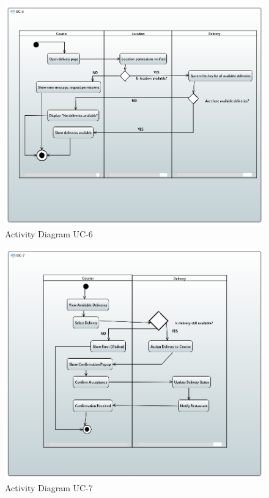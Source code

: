 \begin{figure}[h!]
\begin{center}
\includegraphics[scale=0.5]{FIGS/UC-6.jpg}
    \caption{Activity Diagram UC-6}
    \label{fig:act_diag6}
\end{center}
\end{figure}

\begin{figure}[h!]
\begin{center}
\includegraphics[scale=0.5]{FIGS/UC-7.jpg}
    \caption{Activity Diagram UC-7}
    \label{fig:act_diag7}
\end{center}
\end{figure}

